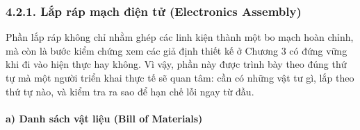 \documentclass[a4paper]{extarticle}
\begin{document}
\subsubsection{4.2.1. Lắp ráp mạch điện tử (Electronics
Assembly)}\label{421-lux1eafp-ruxe1p-mux1ea1ch-ux111iux1ec7n-tux1eed-electronics-assembly}

Phần lắp ráp không chỉ nhằm ghép các linh kiện thành một bo mạch hoàn
chỉnh, mà còn là bước kiểm chứng xem các giả định thiết kế ở Chương 3 có
đứng vững khi đi vào hiện thực hay không. Vì vậy, phần này được trình
bày theo đúng thứ tự mà một người triển khai thực tế sẽ quan tâm: cần có
những vật tư gì, lắp theo thứ tự nào, và kiểm tra ra sao để hạn chế lỗi
ngay từ đầu.

\paragraph{a) Danh sách vật liệu (Bill of
Materials)}\label{a-danh-suxe1ch-vux1eadt-liux1ec7u-bill-of-materials}
\end{document}
